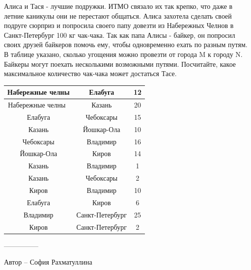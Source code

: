 \question
Алиса и Тася - лучшие подружки. ИТМО связало их так крепко, что даже в летние каникулы они не перестают общаться. Алиса захотела сделать своей подруге сюрприз и попросила своего папу довезти из Набережных Челнов в Санкт-Петербург 100 кг чак-чака. Так как папа Алисы - байкер, он попросил своих друзей байкеров помочь ему, чтобы одновременно ехать по разным путям. В таблице указано, сколько угощения можно провезти от города M к городу N. Байкеры могут поехать несколькими возможными путями. Посчитайте, какое максимальное количество чак-чака может достаться Тасе.

\begin{center}
\begin{tabular}{| c | c | c |}
\hline
Набережные челны & Елабуга & 12\\
\hline
Набережные челны  & Казань & 20\\
\hline
Елабуга & Чебоксары & 15\\
\hline
Казань & Йошкар-Ола & 10\\
\hline
Чебоксары & Владимир & 16\\
\hline
Йошкар-Ола & Киров & 14\\
\hline
Казань& Владимир & 1\\
\hline
Казань& Чебоксары & 2\\
\hline
 Киров & Владимир &10\\\hline
 Елабуга & Киров&6\\\hline
 Владимир & Санкт-Петербург &25\\\hline
 Киров & Санкт-Петербург &2\\\hline

\end{tabular}
\end{center}

---------------

Автор -- София Рахматуллина
